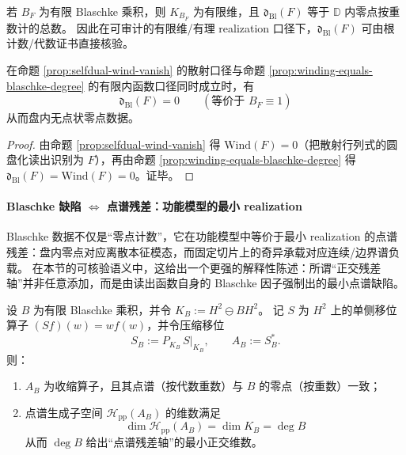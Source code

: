 \begin{remark}\label{rem:blaschke-defect-finite}
若 \(B_F\) 为有限 Blaschke 乘积，则 \(K_{B_F}\) 为有限维，且 \(\mathfrak{d}_{\mathrm{Bl}}(F)\) 等于 \(\mathbb{D}\) 内零点按重数计的总数。
因此在可审计的有限维/有理 realization 口径下，\(\mathfrak{d}_{\mathrm{Bl}}(F)\) 可由根计数/代数证书直接核验。
\end{remark}

\begin{corollary}\label{cor:selfdual-index-vanish-implies-dbl0}
在命题 \ref{prop:selfdual-wind-vanish} 的散射口径与命题 \ref{prop:winding-equals-blaschke-degree} 的有限内函数口径同时成立时，有
\[
\boxed{\;\mathfrak d_{\mathrm{Bl}}(F)=0\qquad(\text{等价于 }B_F\equiv 1)\;}
\]
从而盘内无点状零点数据。
\end{corollary}

\begin{proof}
由命题 \ref{prop:selfdual-wind-vanish} 得 \(\mathrm{Wind}(F)=0\)（把散射行列式的圆盘化读出识别为 \(F\)），再由命题 \ref{prop:winding-equals-blaschke-degree} 得 \(\mathfrak d_{\mathrm{Bl}}(F)=\mathrm{Wind}(F)=0\)。证毕。
\end{proof}

\paragraph{Blaschke 缺陷 \texorpdfstring{$\Leftrightarrow$}{<->} 点谱残差：功能模型的最小 realization}
Blaschke 数据不仅是“零点计数”，它在功能模型中等价于最小 realization 的点谱残差：盘内零点对应离散本征模态，而固定切片上的奇异承载对应连续/边界谱负载。
在本节的可核验语义中，这给出一个更强的解释性陈述：所谓“正交残差轴”并非任意添加，而是由读出函数自身的 Blaschke 因子强制出的最小点谱缺陷。

\begin{theorem}\label{thm:blaschke-point-spectrum-correspondence}
设 \(B\) 为有限 Blaschke 乘积，并令 \(K_B:=H^2\ominus BH^2\)。
记 \(S\) 为 \(H^2\) 上的单侧移位算子 \((Sf)(w)=wf(w)\)，并令压缩移位
\[
S_B:=P_{K_B}\,S|_{K_B},
\qquad
A_B:=S_B^\ast.
\]
则：
\begin{enumerate}
  \item \(A_B\) 为收缩算子，且其点谱（按代数重数）与 \(B\) 的零点（按重数）一致；
  \item 点谱生成子空间 \(\mathcal{H}_{\mathrm{pp}}(A_B)\) 的维数满足
  \[
  \boxed{\;\dim\mathcal{H}_{\mathrm{pp}}(A_B)=\dim K_B=\deg B\;}
  \]
  从而 \(\deg B\) 给出“点谱残差轴”的最小正交维数。
\end{enumerate}
\end{theorem}

